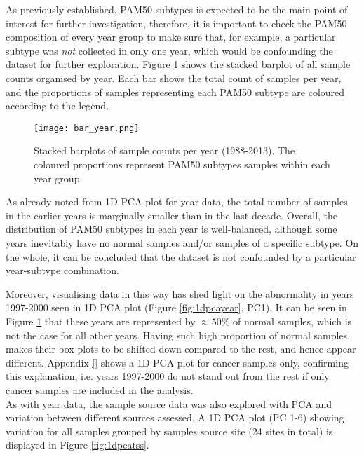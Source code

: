     \newpage
    As previously established, PAM50 subtypes is expected to be the main point of interest for further investigation, therefore, it is important to check the PAM50 composition of every year group to make sure that, for example, a particular subtype was \textit{not} collected in only one year, which would be confounding the dataset for further exploration. Figure \ref{fig:baryear} shows the stacked barplot of all sample counts organised by year. Each bar shows the total count of samples per year, and the proportions of samples representing each PAM50 subtype are coloured according to the legend. \\
    \newline
    
    
            \begin{figure}[!h]
            \centering
            \texttt{[image: bar\_year.png]}
            \caption[Stacked barplots of sample counts per year]{Stacked barplots of sample counts per year (1988-2013). The coloured proportions represent PAM50 subtypes samples within each year group. }
            \label{fig:baryear}
            \end{figure}
    
    As already noted from 1D PCA plot for year data, the total number of samples in the earlier years is marginally smaller than in the last decade. Overall, the distribution of PAM50 subtypes in each year is well-balanced,  although some years inevitably have no normal samples and/or samples of a specific subtype. On the whole, it can be concluded that the dataset is not confounded by a particular year-subtype combination.  
    
    Moreover, visualising data in this way has shed light on the abnormality in years 1997-2000 seen in 1D PCA plot (Figure \ref{fig:1dpcayear}, PC1). It can be seen in Figure \ref{fig:baryear} that these years are represented by $\approx50\%$ of normal samples, which is not the case for all other years. Having such high proportion of normal samples, makes their box plots to be shifted down compared to the rest, and hence appear different. Appendix \ref{} shows a 1D PCA plot for cancer samples only, confirming this explanation, i.e. years 1997-2000 do not stand out from the rest if only cancer samples are included in the analysis. \\
    

    As with year data, the sample source data was also explored with PCA and variation between different sources assessed. A 1D PCA plot (PC 1-6) showing variation for all samples grouped by samples source site (24 sites in total) is displayed in Figure \ref{fig:1dpcatss}. 
    
